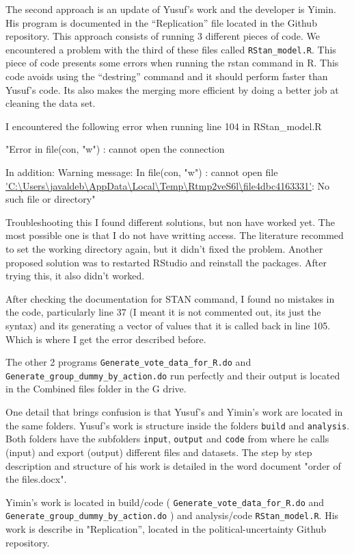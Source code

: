 \documentclass[a4paper,12pt]{article}
\begin{document}
\begin{enumerate}
The second approach is an update of Yusuf’s work and the developer is Yimin. His program is documented in the “Replication” file located in the Github repository. This approach consists of running 3 different pieces of code. We encountered a problem with the third of these files called \texttt{RStan\_model.R}. This piece of code presents some errors when running the rstan command in R.  This code avoids using the “destring” command and it should perform faster than Yusuf’s code. Its also makes the merging more efficient by doing a better job at cleaning the data set.  

I encountered the following error when running line 104 in RStan\_model.R 

"Error in file(con, "w") : cannot open the connection

In addition: Warning message:
In file(con, "w") :
  cannot open file \url{'C:\Users\javaldeb\AppData\Local\Temp\Rtmp2veS6l\file4dbc4163331'}: No such file or directory"

Troubleshooting this I found different solutions, but non have worked yet. The most possible one is that I do not have writting access. The literature recommed to set the working directory again, but it didn't fixed the problem. Another proposed solution was to  restarted RStudio and reinstall the packages. After trying this, it also didn't worked. 


After checking the documentation for STAN command, I found no mistakes in the code, particularly line 37 (I meant it is not commented out, its just the syntax)
and its generating a vector of values that it is called back in line 105. Which is where I get the error described before. 



The other 2 programs \texttt{Generate\_vote\_data\_for\_R.do} and \texttt{Generate\_group\_dummy\_by\_action.do} run perfectly and their output is located in the Combined files folder in the G drive. 

One detail that brings confusion is that Yusuf's and Yimin's work are located in the same folders. 
Yusuf's work is structure inside the folders \texttt{build} and \texttt{analysis}. Both folders have the subfolders \texttt{input}, \texttt{output} and \texttt{code} from where he calls (input) and export (output) different files and datasets. The step by step description and structure of his work is detailed in the word document "order of the files.docx".

Yimin's work is located in build/code ( \texttt{Generate\_vote\_data\_for\_R.do} and \texttt{Generate\_group\_dummy\_by\_action.do} ) and analysis/code \texttt{RStan\_model.R}. His work is describe in "Replication'', located in the political-uncertainty Github repository. 


\end{enumerate}
\end{document}
